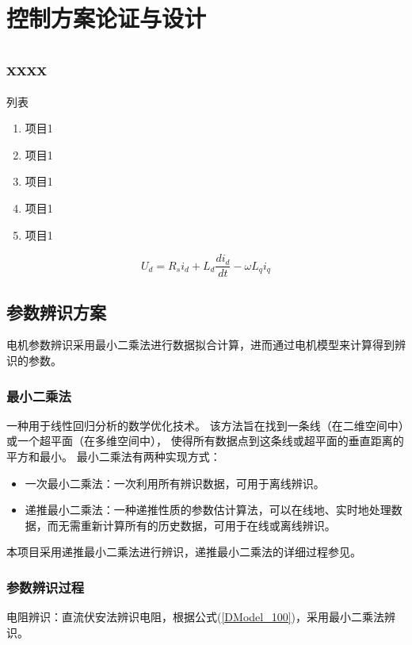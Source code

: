 ﻿\documentclass[12pt,a4paper]{article}
\begin{document}
\newpage
\section{控制方案论证与设计} \label{原理章}

\subsection{xxxx}
列表
\begin{enumerate}
  \item {项目1}
  \item {项目1}
  \item {项目1}
  \item {项目1}
  \item {项目1}
\end{enumerate}


\begin{equation}
  \label{EModel_1}
  U_{d}=R_{s}i_{d}+L_{d}\frac{di_{d}}{dt}-\omega L_{q}i_{q}
\end{equation}



\subsection{参数辨识方案}
电机参数辨识采用最小二乘法进行数据拟合计算\cite{Odhano2019}，进而通过电机模型来计算得到辨识的参数\cite{Fazdi2023}。

\subsubsection{最小二乘法}
一种用于线性回归分析的数学优化技术。
该方法旨在找到一条线（在二维空间中）或一个超平面（在多维空间中），
使得所有数据点到这条线或超平面的垂直距离的平方和最小。
最小二乘法有两种实现方式：
\begin{itemize}
  \item 一次最小二乘法：一次利用所有辨识数据，可用于离线辨识。
  \item 递推最小二乘法：一种递推性质的参数估计算法，可以在线地、实时地处理数据，而无需重新计算所有的历史数据，可用于在线或离线辨识。
\end{itemize}
本项目采用递推最小二乘法进行辨识，递推最小二乘法的详细过程参见\cite{lian_parameter_2023}。

\subsubsection{参数辨识过程}
电阻辨识：直流伏安法辨识电阻，根据公式(\ref{DModel_100})，采用最小二乘法辨识。
\end{document}

